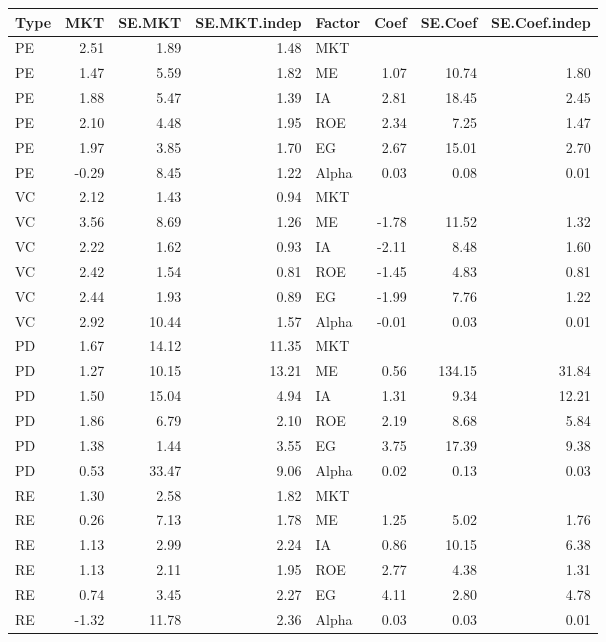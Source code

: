 \documentclass[12pt]{article}
\begin{document}
\begin{table}[ht]
	\centering
	\begin{tabular}{lrrrlrrr}
		\hline
		Type & MKT & SE.MKT & SE.MKT.indep & Factor & Coef & SE.Coef & SE.Coef.indep \\ 
		\hline
		PE & 2.51 & 1.89 & 1.48 & MKT &  &  &  \\ 
		PE & 1.47 & 5.59 & 1.82 & ME & 1.07 & 10.74 & 1.80 \\ 
		PE & 1.88 & 5.47 & 1.39 & IA & 2.81 & 18.45 & 2.45 \\ 
		PE & 2.10 & 4.48 & 1.95 & ROE & 2.34 & 7.25 & 1.47 \\ 
		PE & 1.97 & 3.85 & 1.70 & EG & 2.67 & 15.01 & 2.70 \\ 
		PE & -0.29 & 8.45 & 1.22 & Alpha & 0.03 & 0.08 & 0.01 \\ 
		VC & 2.12 & 1.43 & 0.94 & MKT &  &  &  \\ 
		VC & 3.56 & 8.69 & 1.26 & ME & -1.78 & 11.52 & 1.32 \\ 
		VC & 2.22 & 1.62 & 0.93 & IA & -2.11 & 8.48 & 1.60 \\ 
		VC & 2.42 & 1.54 & 0.81 & ROE & -1.45 & 4.83 & 0.81 \\ 
		VC & 2.44 & 1.93 & 0.89 & EG & -1.99 & 7.76 & 1.22 \\ 
		VC & 2.92 & 10.44 & 1.57 & Alpha & -0.01 & 0.03 & 0.01 \\ 
		PD & 1.67 & 14.12 & 11.35 & MKT &  &  &  \\ 
		PD & 1.27 & 10.15 & 13.21 & ME & 0.56 & 134.15 & 31.84 \\ 
		PD & 1.50 & 15.04 & 4.94 & IA & 1.31 & 9.34 & 12.21 \\ 
		PD & 1.86 & 6.79 & 2.10 & ROE & 2.19 & 8.68 & 5.84 \\ 
		PD & 1.38 & 1.44 & 3.55 & EG & 3.75 & 17.39 & 9.38 \\ 
		PD & 0.53 & 33.47 & 9.06 & Alpha & 0.02 & 0.13 & 0.03 \\ 
		RE & 1.30 & 2.58 & 1.82 & MKT &  &  &  \\ 
		RE & 0.26 & 7.13 & 1.78 & ME & 1.25 & 5.02 & 1.76 \\ 
		RE & 1.13 & 2.99 & 2.24 & IA & 0.86 & 10.15 & 6.38 \\ 
		RE & 1.13 & 2.11 & 1.95 & ROE & 2.77 & 4.38 & 1.31 \\ 
		RE & 0.74 & 3.45 & 2.27 & EG & 4.11 & 2.80 & 4.78 \\ 
		RE & -1.32 & 11.78 & 2.36 & Alpha & 0.03 & 0.03 & 0.01 \\ 

\end{tabular}
\end{table}
\end{document}
